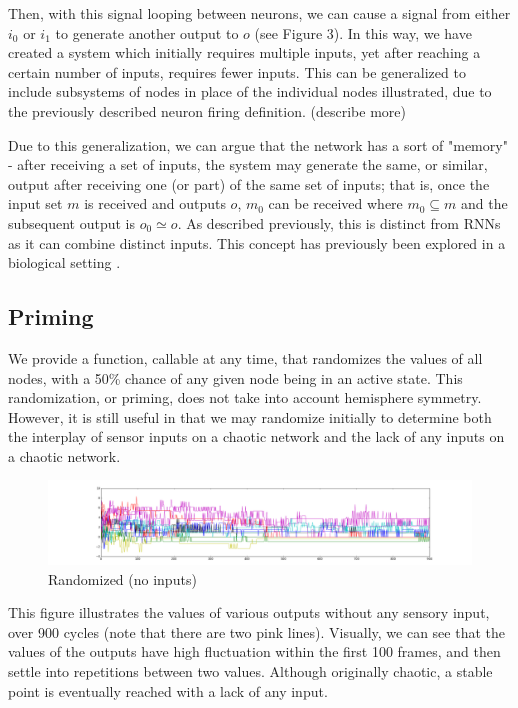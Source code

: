 \documentclass[12pt]{article}
\begin{document}
Then, with this signal looping between neurons, we can cause a signal from either $i_0$ or $i_1$ to generate another output to $o$ (see Figure 3).  In this way, we have created a system which initially requires multiple inputs, yet after reaching a certain number of inputs, requires fewer inputs.  This can be generalized to include subsystems of nodes in place of the individual nodes illustrated, due to the previously described neuron firing definition. (describe more)

Due to this generalization, we can argue that the network has a sort of "memory" - after receiving a set of inputs, the system may generate the same, or similar, output after receiving one (or part) of the same set of inputs; that is, once the input set $m$ is received and outputs $o$, $m_0$ can be received where $m_0 \subseteq m$ and the subsequent output is $o_0 \simeq o$.  As described previously, this is distinct from RNNs as it can combine distinct inputs.  This concept has previously been explored in a biological setting \cite{synapsememory}.

\subsection{Priming} \label{priming}

We provide a function, callable at any time, that randomizes the values of all nodes, with a 50\% chance of any given node being in an active state.  This randomization, or priming, does not take into account hemisphere symmetry.  However, it is still useful in that we may randomize initially to determine both the interplay of sensor inputs on a chaotic network and the lack of any inputs on a chaotic network.

\begin{figure}[H]
    \includegraphics[width=\linewidth]{../visualizations/8knodes_stable_line.png}
    \caption{Randomized (no inputs)}
\end{figure}

This figure illustrates the values of various outputs without any sensory input, over 900 cycles (note that there are two pink lines).  Visually, we can see that the values of the outputs have high fluctuation within the first 100 frames, and then settle into repetitions  between two values.  Although originally chaotic, a stable point is eventually reached with a lack of any input.
\end{document}
